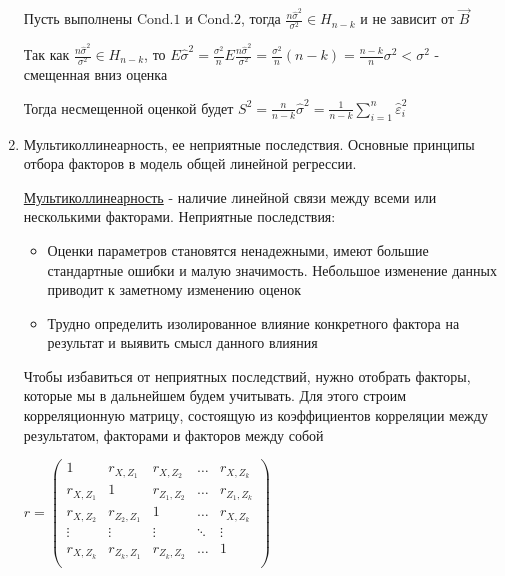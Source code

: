 \begin{enumerate}
    \begin{MyTheorem}
        Пусть выполнены $\mathrm{Cond. 1}$ и $\mathrm{Cond. 2}$, тогда $\frac{n \hat \sigma^2}{\sigma^2} \in H_{n - k}$ и не зависит от $\vec B$
    \end{MyTheorem}
    
    Так как $\frac{n \hat \sigma^2}{\sigma^2} \in H_{n - k}$, то $E \hat \sigma^2 = \frac{\sigma^2}{n} E \frac{n \hat \sigma^2}{\sigma^2} = \frac{\sigma^2}{n} (n - k) = \frac{n - k}{n} \sigma^2 < \sigma^2$ - смещенная вниз оценка
    
    Тогда несмещенной оценкой будет $S^2 = \frac{n}{n - k} \hat \sigma^2 = \frac{1}{n - k} \sum_{i = 1}^n \hat \varepsilon_i^2$

    \item Мультиколлинеарность, ее неприятные последствия. Основные принципы отбора факторов в модель общей линейной регрессии.

    \Def \hyperlink{multicollinearity}{Мультиколлинеарность} - наличие линейной связи между всеми или несколькими факторами. Неприятные последствия:

    \begin{itemize}
        \item Оценки параметров становятся ненадежными, имеют большие стандартные ошибки и малую значимость.
        Небольшое изменение данных приводит к заметному изменению оценок
        \item Трудно определить изолированное влияние конкретного фактора на результат и выявить смысл данного влияния
    \end{itemize}

    Чтобы избавиться от неприятных последствий, нужно отобрать факторы, которые мы в дальнейшем будем учитывать. Для этого строим корреляционную матрицу, состоящую из коэффициентов корреляции между результатом, факторами и факторов между собой 

    \smallvspace

    $r = \begin{pmatrix}
        1 & r_{X, Z_1} & r_{X, Z_2} & \dots & r_{X, Z_k} \\ 
        r_{X, Z_1} & 1 & r_{Z_1, Z_2} & \dots & r_{Z_1, Z_k} \\ 
        r_{X, Z_2} & r_{Z_2, Z_1} & 1 & \dots & r_{X, Z_k} \\ 
        \vdots & \vdots & \vdots & \ddots & \vdots \\ 
        r_{X, Z_k} & r_{Z_k, Z_1} & r_{Z_k, Z_2} & \dots & 1 \\ 
    \end{pmatrix}$


\end{enumerate}
